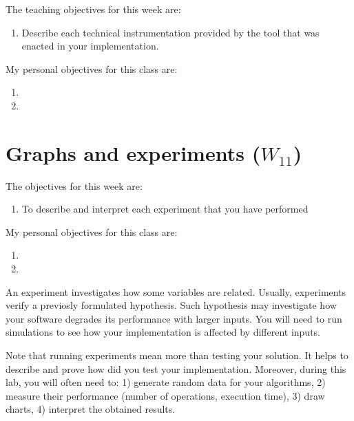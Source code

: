 \documentclass[a4paper,12pt]{report}
\begin{document}
The teaching objectives for this week are:
\begin{enumerate}
 \item Describe each technical instrumentation provided 
by the tool that was enacted in your implementation.
\end{enumerate}

\vspace{0.5cm}

My personal objectives for this class are:
\begin{enumerate}
 \item 
 \item 
\end{enumerate}





\chapter{Graphs and experiments ($W_{11}$)}

The objectives for this week are:
\begin{enumerate}
 \item To describe and interpret each experiment that you have performed
\end{enumerate}

\vspace{0.5cm}

My personal objectives for this class are:
\begin{enumerate}
 \item 
 \item 
\end{enumerate}


An experiment investigates how some variables are related. 
Usually, experiments verify a previosly formulated hypothesis.
Such hypothesis may investigate how your software degrades its performance with larger inputs.
You will need to run simulations to see how your implementation is affected by different inputs.


Note that running experiments mean more than testing your solution. 
It helps to describe and prove how did you test your implementation.
Moreover, during this lab, you will often need to: 
1) generate random data for your algorithms,
2) measure their performance (number of operations, execution time),
3) draw charts,
4) interpret the obtained results.
\end{document}
